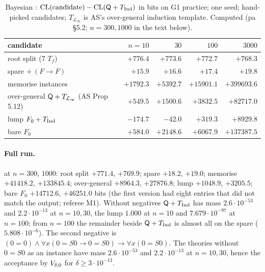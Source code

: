 \begin{table}[ht]\centering\footnotesize
\begin{tabular}{@{}lrrrr@{}}
\toprule
candidate & $n=10$ & $30$ & $100$ & $3000$\\
\midrule
root split (7 $T_f$) & $+776.4$ & $+773.6$ & $+772.7$ & $+768.3$\\
spare $+\,(F\to F)$ & $+15.9$ & $+16.6$ & $+17.4$ & $+19.8$\\
memorise instances & $+1792.3$ & $+5392.7$ & $+15901.1$ & $+399693.6$\\
over-general $\mathsf{Q}+T_{\mathcal L_\infty}$ (AS Prop 5.12) & $+549.5$ & $+1500.6$ & $+3832.5$ & $+82717.0$\\
lump $F_0+T_{\mathrm{Ind}}$ & $-174.7$ & $-42.0$ & $+319.3$ & $+8929.8$\\
bare $F_0$ & $+584.0$ & $+2148.6$ & $+6067.9$ & $+137387.5$\\
\bottomrule
\end{tabular}
\caption{Bayesian \DTRC{}: $\mathrm{CL}(\text{candidate})-\mathrm{CL}(\mathsf{Q}+T_{\mathrm{Ind}})$ in bits on G1 practice; one seed; hand-picked candidates; $T_{\mathcal L_\infty}$ is AS's over-general induction template. Computed (pa \S5.2; $n=300,1000$ in the text below).}\label{tab:pa:dtrc}
\end{table}

\paragraph{Full \DTRC{} run.}  at $n=300$, $1000$: root split $+771.4$, $+769.9$; spare $+18.2$, $+19.0$; memorise $+41418.2$, $+133845.4$; over-general $+8964.3$, $+27876.8$; lump $+1048.9$, $+3205.5$; bare $F_0$ $+14712.6$, $+46251.0$ bits (the first version had eight entries that did not match the output; referee M1). Without negatives $\mathsf{Q}+T_{\mathrm{Ind}}$ has mass $2.6\cdot10^{-53}$ and $2.2\cdot10^{-13}$ at $n=10,30$, the lump $1.000$ at $n=10$ and $7.679\cdot10^{-97}$ at $n=100$; from $n=100$ the remainder beside $\mathsf{Q}+T_{\mathrm{Ind}}$ is almost all on the spare ($5.808\cdot10^{-6}$). The second negative is $(0=0)\wedge\forall x(0=S0\to0=S0)\to\forall x(0=S0)$. The theories without $0=S0$ as an instance have mass $2.6\cdot10^{-53}$ and $2.2\cdot10^{-13}$ at $n=10,30$, hence the acceptance by $V_{\delta,0}$ for $\delta\ge3\cdot10^{-13}$.

